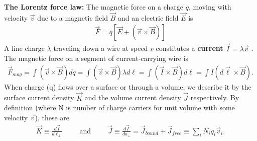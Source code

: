 \textbf{The Lorentz force law:} The magnetic force on a charge $q$, moving with velocity $\vec{v}$ due to a magnetic field $\vec{B}$ and an electric field $\vec{E}$ is
\begin{align}
	\vec{F} = q[\vec{E}+(\vec{v}\times \vec{B})]
\end{align}
A line charge $\lambda$ traveling down a wire at speed $v$ constitutes a \textbf{current} $\vec{I}=\lambda \vec{v}$ \cite{bib:Griffiths}. The magnetic force on a segment of current-carrying wire is
\begin{align}
	\vec{F}_{mag} = \int (\vec{v}\times \vec{B})dq = \int (\vec{v}\times \vec{B})\lambda d\ell = \int (\vec{I}\times \vec{B})d\ell = \int I (d\vec{\ell}\times \vec{B}).
\end{align} 
When charge (q) flows over a surface or through a volume, we describe it by the surface current density $\vec{K}$ and the volume current density $\vec{J}$ respectively. By definition (where N is number of charge carriers for unit volume with some velocity $\vec{v}$), these are
\begin{align}
	\vec{K} \equiv \frac{d\vec{I}}{d\ell_\perp} \hspace{1cm}\textrm{and}\hspace{1cm}\vec{J}\equiv \frac{d\vec{I}}{da_\perp} = \vec{J}_{bound}+\vec{J}_{free} \equiv \sum_{i}N_iq_i\vec{v}_i.
\end{align}

